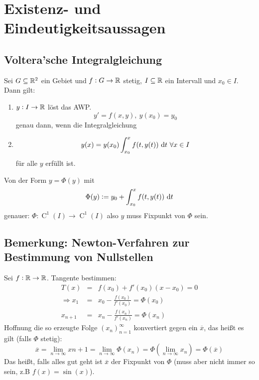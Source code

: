 \section{Existenz- und Eindeutigkeitsaussagen}
\subsection{Voltera'sche Integralgleichung}
Sei $G \subseteq \mathbb{R}^2$ ein Gebiet und $f:G \rightarrow \mathbb{R}$ stetig, $I \subseteq \mathbb{R}$ ein Intervall und
$x_0 \in I$. Dann gilt:
\begin{enumerate}
	\item $y: I \rightarrow \mathbb{R}$ löst das AWP.
		\begin{equation*}
			y' = f(x,y),\ y(x_0) = y_0
		\end{equation*}
		genau dann, wenn die Integralgleichung
	\item
		\begin{equation*}
			y(x) = y(x_0) \int_{x_0}^x f(t, y(t)) \text{ d}t\ \forall x \in I
		\end{equation*}
		für alle $y$ erfüllt ist.
\end{enumerate}

Von der Form $y=\Phi(y)$ mit
\begin{equation*}
	\Phi(y) := y_0 + \int_{x_0}^x f(t, y(t)) \text{ d}t
\end{equation*}
genauer: $\Phi: \operatorname{C}^1(I) \rightarrow \operatorname{C}^1(I)$ also $y$ muss Fixpunkt von $\Phi$ sein.

\subsection{Bemerkung: Newton-Verfahren zur Bestimmung von Nullstellen}
Sei $f: \mathbb{R} \rightarrow \mathbb{R}$. Tangente bestimmen:
\begin{eqnarray*}
	T(x) &=& f(x_0) + f'(x_0) (x-x_0) = 0 \\
	\Rightarrow x_1 &=& x_0 - \frac{f(x_0)}{f'(x_0)} = \Phi(x_0) \\
	x_{n+1} &=& x_n - \frac{f(x_n)}{f'(x_n)} = \Phi(x_n)
\end{eqnarray*}
Hoffnung die so erzeugte Folge ${(x_n)}_{n=1}^\infty$ konvertiert gegen ein $\overline{x}$, 
das heißt es gilt (falls $\Phi$ stetig):
\begin{equation*}
	\overline{x} = \lim_{n \to \infty} x{n+1} = \lim_{n \to \infty} \Phi(x_n) = \Phi(\lim_{n \to \infty} x_n) = \Phi(\overline{x})
\end{equation*}
Das heißt, falls alles gut geht ist $\overline{x}$ der Fixpunkt von $\Phi$ 
(muss aber nicht immer so sein, z.B $f(x)=\sin(x)$).

